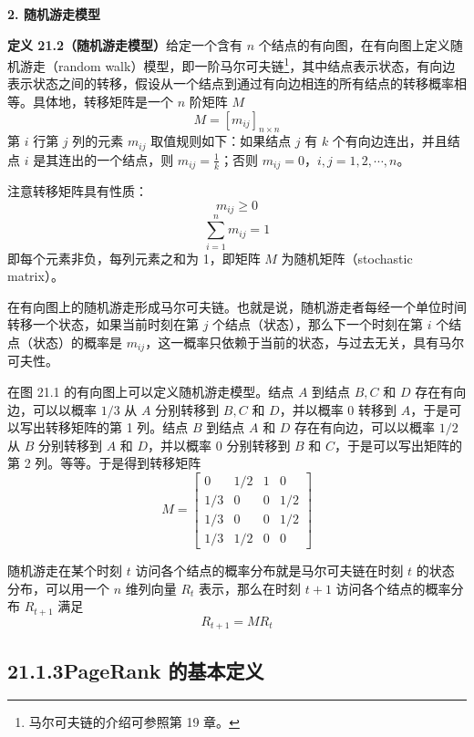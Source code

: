 \documentclass[UTF8,12pt,a4paper,fontset=fandol]{ctexart}
\begin{document}
\noindent\textbf{2. 随机游走模型}

\noindent\textbf{定义 21.2（随机游走模型）}\quad 给定一个含有 $n$ 个结点的有向图，在有向图上定义随机游走（random walk）模型，即一阶马尔可夫链\footnote{马尔可夫链的介绍可参照第 19 章。}，其中结点表示状态，有向边表示状态之间的转移，假设从一个结点到通过有向边相连的所有结点的转移概率相等。具体地，转移矩阵是一个 $n$ 阶矩阵 $M$
\begin{equation}
M=[m_{ij}]_{n\times n}
\tag{21.1}
\end{equation}
第 $i$ 行第 $j$ 列的元素 $m_{ij}$ 取值规则如下：如果结点 $j$ 有 $k$ 个有向边连出，并且结点 $i$ 是其连出的一个结点，则 $m_{ij}=\frac{1}{k}$；否则 $m_{ij}=0$，$i,j=1,2,\cdots,n$。

注意转移矩阵具有性质：
\begin{equation}
m_{ij}\geqslant 0
\tag{21.2}
\end{equation}
\begin{equation}
\sum_{i=1}^n m_{ij}=1
\tag{21.3}
\end{equation}
即每个元素非负，每列元素之和为 1，即矩阵 $M$ 为随机矩阵（stochastic matrix）。

在有向图上的随机游走形成马尔可夫链。也就是说，随机游走者每经一个单位时间转移一个状态，如果当前时刻在第 $j$ 个结点（状态），那么下一个时刻在第 $i$ 个结点（状态）的概率是 $m_{ij}$，这一概率只依赖于当前的状态，与过去无关，具有马尔可夫性。

在图 21.1 的有向图上可以定义随机游走模型。结点 $A$ 到结点 $B,C$ 和 $D$ 存在有向边，可以以概率 $1/3$ 从 $A$ 分别转移到 $B,C$ 和 $D$，并以概率 0 转移到 $A$，于是可以写出转移矩阵的第 1 列。结点 $B$ 到结点 $A$ 和 $D$ 存在有向边，可以以概率 $1/2$ 从 $B$ 分别转移到 $A$ 和 $D$，并以概率 0 分别转移到 $B$ 和 $C$，于是可以写出矩阵的第 2 列。等等。于是得到转移矩阵
\[
M=
\begin{bmatrix}
0 & 1/2 & 1 & 0\\
1/3 & 0 & 0 & 1/2\\
1/3 & 0 & 0 & 1/2\\
1/3 & 1/2 & 0 & 0
\end{bmatrix}
\]

随机游走在某个时刻 $t$ 访问各个结点的概率分布就是马尔可夫链在时刻 $t$ 的状态分布，可以用一个 $n$ 维列向量 $R_t$ 表示，那么在时刻 $t+1$ 访问各个结点的概率分布 $R_{t+1}$ 满足
\begin{equation}
R_{t+1}=MR_t
\tag{21.4}
\end{equation}

\subsection*{21.1.3\quad PageRank 的基本定义}
\end{document}
